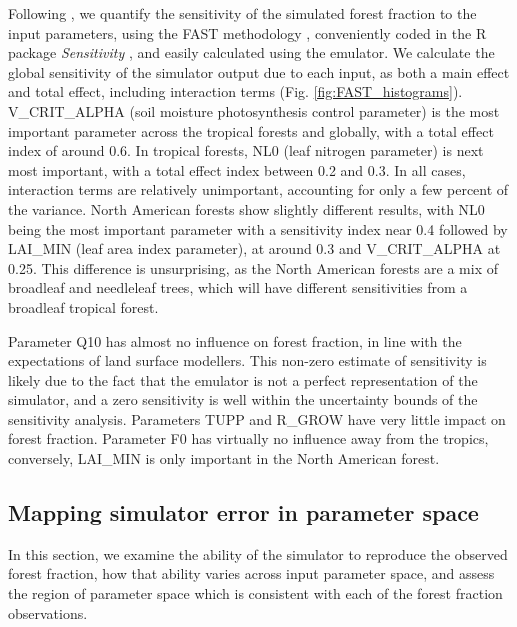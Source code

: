 \documentclass[esd, manuscript]{copernicus}
\begin{document}
Following \citep{carslaw2013large}, we quantify the sensitivity of the simulated forest fraction to the input parameters, using the FAST methodology \citep{saltelli1999sensitivity}, conveniently coded in the R package \emph{Sensitivity} \citep{Rpackage2015sensitivity}, and easily calculated using the emulator. We calculate the global sensitivity of the simulator output due to each input, as both a main effect and total effect, including interaction terms (Fig. \ref{fig:FAST_histograms}). V\_CRIT\_ALPHA (soil moisture photosynthesis control parameter) is the most important parameter across the tropical forests and globally, with a total effect index of around 0.6. In tropical forests, NL0 (leaf nitrogen parameter) is next most important, with a total effect index between 0.2 and 0.3. In all cases, interaction terms are relatively unimportant, accounting for only a few percent of the variance. North American forests show slightly different results, with NL0 being the most important parameter with a sensitivity index near 0.4 followed by LAI\_MIN (leaf area index parameter), at around 0.3 and V\_CRIT\_ALPHA at 0.25. This difference is unsurprising, as the North American forests are a mix of broadleaf and needleleaf trees, which will have different sensitivities from a broadleaf tropical forest.


Parameter Q10 has almost no influence on forest fraction, in line with the expectations of land surface modellers. This non-zero estimate of sensitivity is likely due to the fact that the emulator is not a perfect representation of the simulator, and a zero sensitivity is well within the uncertainty bounds of the sensitivity analysis. Parameters TUPP and R\_GROW have very little impact on forest fraction. Parameter F0 has virtually no influence away from the tropics, conversely, LAI\_MIN is only important in the North American forest.


\subsection{Mapping simulator error in parameter space}\label{ssec:mapping}

In this section, we examine the ability of the simulator to reproduce the observed forest fraction, how that ability varies across input parameter space, and assess the region of parameter space which is consistent with each of the forest fraction observations.
\end{document}
